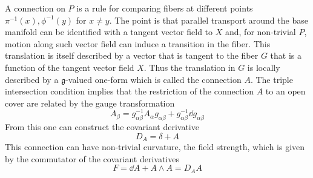 A connection on $P$ is a rule for comparing fibers at different points $\pi^{-1}(x),\phi^{-1}(y)$ for $x\neq y$. The point is that parallel transport around the base manifold can be identified with a tangent vector field to $X$ and, for non-trivial $P$, motion along such vector field can induce a transition in the fiber. This translation is itself described by a vector that is tangent to the fiber $G$ that is a function of the tangent vector field $X$. Thus the translation in $G$ is locally described by a $\mathfrak{g}$-valued one-form which is called the connection $A$. The triple intersection condition implies that the restriction of the connection $A$ to an open cover are related by the gauge transformation 
\begin{equation}
    A_\beta=g^{-1}_{\alpha \beta} A_\alpha g_{\alpha \beta}+ g_{\alpha \beta}^{-1}\dd{g}_{\alpha \beta}
\end{equation}
From this one can construct the covariant derivative 
\begin{equation}
    D_A=\delta+A
\end{equation}
This connection can have non-trivial curvature, the field strength, which is given by the commutator of the covariant derivatives 
\begin{equation}
    F=\dd{A}+A\wedge A=D_A A
\end{equation}

